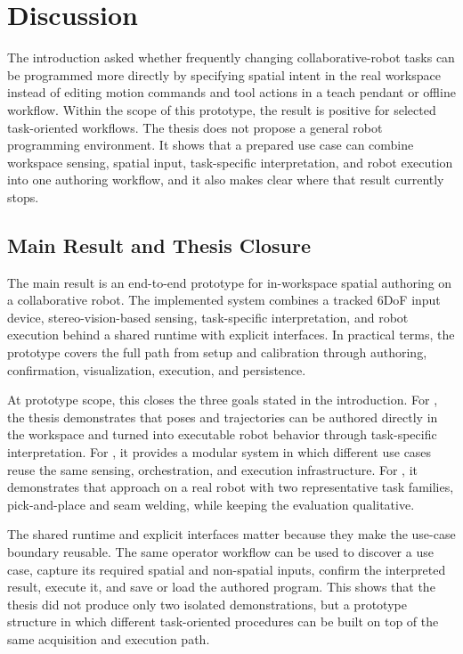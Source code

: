 \chapter{Discussion} \label{chapter:ch6_discussion}

The introduction asked whether frequently changing collaborative-robot tasks can be programmed more directly by specifying spatial intent in the real workspace instead of editing motion commands and tool actions in a teach pendant or offline workflow. Within the scope of this prototype, the result is positive for selected task-oriented workflows. The thesis does not propose a general robot programming environment. It shows that a prepared use case can combine workspace sensing, spatial input, task-specific interpretation, and robot execution into one authoring workflow, and it also makes clear where that result currently stops.

\section{Main Result and Thesis Closure}

The main result is an end-to-end prototype for in-workspace spatial authoring on a collaborative robot. The implemented system combines a tracked 6DoF input device, stereo-vision-based sensing, task-specific interpretation, and robot execution behind a shared runtime with explicit interfaces. In practical terms, the prototype covers the full path from setup and calibration through authoring, confirmation, visualization, execution, and persistence.

At prototype scope, this closes the three goals stated in the introduction. For , the thesis demonstrates that poses and trajectories can be authored directly in the workspace and turned into executable robot behavior through task-specific interpretation. For , it provides a modular system in which different use cases reuse the same sensing, orchestration, and execution infrastructure. For , it demonstrates that approach on a real robot with two representative task families, pick-and-place and seam welding, while keeping the evaluation qualitative.

The shared runtime and explicit interfaces matter because they make the use-case boundary reusable. The same operator workflow can be used to discover a use case, capture its required spatial and non-spatial inputs, confirm the interpreted result, execute it, and save or load the authored program. This shows that the thesis did not produce only two isolated demonstrations, but a prototype structure in which different task-oriented procedures can be built on top of the same acquisition and execution path.

